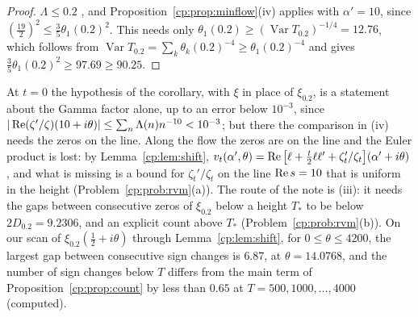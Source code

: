 \begin{proof}
$\Lambda\le0.2$ \cite{PT21}, and Proposition~\ref{cp:prop:minflow}(iv) applies with $\alpha'=10$, since $(\frac{19}2)^2\le\frac35\theta_1(0.2)^2$. This needs only $\theta_1(0.2)\ge(\operatorname{Var}T_{0.2})^{-1/4}=12.76$, which follows from $\operatorname{Var}T_{0.2}=\sum_k\theta_k(0.2)^{-4}\ge\theta_1(0.2)^{-4}$ and gives $\frac35\theta_1(0.2)^2\ge97.69\ge90.25$.
\end{proof}

\begin{remark}\label{cp:rem:minflow}
At $t=0$ the hypothesis of the corollary, with $\xi$ in place of $\xi_{0.2}$, is a statement about the Gamma factor alone, up to an error below $10^{-3}$, since $|\operatorname{Re}(\zeta'/\zeta)(10+i\theta)|\le\sum_n\Lambda(n)n^{-10}<10^{-3}$; but there the comparison in (iv) needs the zeros on the line. Along the flow the zeros are on the line and the Euler product is lost: by Lemma~\ref{cp:lem:shift}, $v_t(\alpha',\theta)=\operatorname{Re}\big[\ell+\frac t2\ell\ell'+\zeta_t'/\zeta_t\big](\alpha'+i\theta)$, and what is missing is a bound for $\zeta_t'/\zeta_t$ on the line $\operatorname{Re} s=10$ that is uniform in the height (Problem~\ref{cp:prob:rvm}(a)). The route of the note \cite{P26heat} is (iii): it needs the gaps between consecutive zeros of $\xi_{0.2}$ below a height $T_*$ to be below $2D_{0.2}=9.2306$, and an explicit count above $T_*$ (Problem~\ref{cp:prob:rvm}(b)). On our scan of $\xi_{0.2}(\frac12+i\theta)$ through Lemma~\ref{cp:lem:shift}, for $0\le\theta\le4200$, the largest gap between consecutive sign changes is $6.87$, at $\theta=14.0768$, and the number of sign changes below $T$ differs from the main term of Proposition~\ref{cp:prop:count} by less than $0.65$ at $T=500,1000,\dots,4000$ (computed).
\end{remark}

